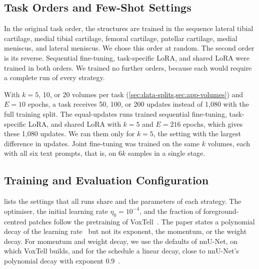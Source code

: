 \subsection{Task Orders and Few-Shot Settings}
\label{subsec:exp-data}

In the original task order, the structures are trained in the sequence lateral tibial cartilage, medial tibial cartilage, femoral cartilage, patellar cartilage, medial meniscus, and lateral meniscus.
We chose this order at random.
The second order is its reverse.
Sequential fine-tuning, task-specific LoRA, and shared LoRA were trained in both orders.
We trained no further orders, because each would require a complete run of every strategy.

\begin{table}[tb] %
\centering
\caption[Overview of the experiments]{Overview of the experiments. Training volumes per task: 108 is the full training split. Objective: number of the research objective in \cref{sec:intro-rq}. All runs use the original task order unless stated otherwise.}
\label{tab:ch6_experiments}

\end{table}

With $k = 5$, 10, or 20 volumes per task (\cref{sec:data-splits,sec:app-volumes}) and $E = 10$ epochs, a task receives 50, 100, or 200 updates instead of 1{,}080 with the full training split.
The equal-updates runs trained sequential fine-tuning, task-specific LoRA, and shared LoRA with $k = 5$ and $E = 216$ epochs, which gives these 1{,}080 updates.
We ran them only for $k = 5$, the setting with the largest difference in updates.
Joint fine-tuning was trained on the same $k$ volumes, each with all six text prompts, that is, on $6k$ samples in a single stage.

\subsection{Training and Evaluation Configuration}
\label{subsec:exp-config}

 lists the settings that all runs share and the parameters of each strategy.
The optimiser, the initial learning rate $\eta_0 = 10^{-4}$, and the fraction of foreground-centred patches follow the pretraining of VoxTell~\cite[Suppl.~Sec.~A]{rokuss2025voxtellfreetextpromptableuniversal}.
The paper states a polynomial decay of the learning rate~\cite[Suppl.~Sec.~A]{rokuss2025voxtellfreetextpromptableuniversal} but not its exponent, the momentum, or the weight decay.
For momentum and weight decay, we use the defaults of nnU-Net, on which VoxTell builds, and for the schedule a linear decay, close to nnU-Net's polynomial decay with exponent 0.9~\cite{isensee2026nnunet}.

